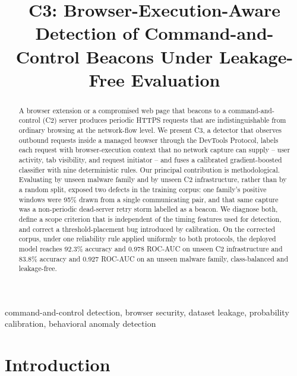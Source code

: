\documentclass[conference,a4paper]{IEEEtran}
\begin{document}
\title{C3: Browser-Execution-Aware Detection of Command-and-Control Beacons Under Leakage-Free Evaluation}

\author{
}

\maketitle

\begin{abstract}
A browser extension or a compromised web page that beacons to a command-and-control (C2) server produces periodic HTTPS requests that are indistinguishable from ordinary browsing at the network-flow level. We present C3, a detector that observes outbound requests inside a managed browser through the DevTools Protocol, labels each request with browser-execution context that no network capture can supply -- user activity, tab visibility, and request initiator -- and fuses a calibrated gradient-boosted classifier with nine deterministic rules. Our principal contribution is methodological. Evaluating by unseen malware family and by unseen C2 infrastructure, rather than by a random split, exposed two defects in the training corpus: one family's positive windows were 95\% drawn from a single communicating pair, and that same capture was a non-periodic dead-server retry storm labelled as a beacon. We diagnose both, define a scope criterion that is independent of the timing features used for detection, and correct a threshold-placement bug introduced by calibration. On the corrected corpus, under one reliability rule applied uniformly to both protocols, the deployed model reaches 92.3\% accuracy and 0.978 ROC-AUC on unseen C2 infrastructure and 83.8\% accuracy and 0.927 ROC-AUC on an unseen malware family, class-balanced and leakage-free.
\end{abstract}

\begin{IEEEkeywords}
command-and-control detection, browser security, dataset leakage, probability calibration, behavioral anomaly detection
\end{IEEEkeywords}

\section{Introduction}
\end{document}
